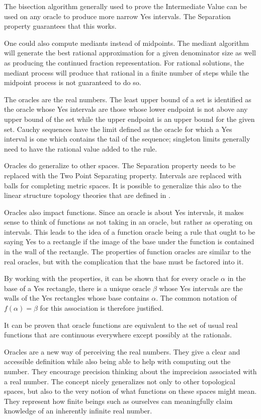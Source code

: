 \documentclass[12pt]{article}
\begin{document}
The bisection algorithm generally used to prove the Intermediate Value can be used on any oracle to produce more narrow Yes intervals. The Separation property guarantees that this works. 

One could also compute mediants instead of midpoints. The mediant algorithm will generate the best rational approximation for a given denominator size as well as producing the continued fraction representation. For rational solutions, the mediant process will produce that rational in a finite number of steps while the midpoint process is not guaranteed to do so. 

The oracles are the real numbers. The least upper bound of a set is identified as the oracle whose Yes intervals are those whose lower endpoint is not above any upper bound of the set while the upper endpoint is an upper bound for the given set. Cauchy sequences have the limit defined as the oracle for which a Yes interval is one which contains the tail of the sequence; singleton limits generally need to have the rational value added to the rule. 

Oracles do generalize to other spaces. The Separation property needs to be replaced with the Two Point Separating property. Intervals are replaced with balls for completing metric spaces. It is possible to generalize this also to the linear structure topology theories that are defined in \cite{maudlin}.

Oracles also impact functions. Since an oracle is about Yes intervals, it makes sense to think of functions as not taking in an oracle, but rather as operating on intervals. This leads to the idea of a function oracle being a rule that ought to be saying Yes to a rectangle if the image of the base under the function is contained in the wall of the rectangle. The properties of function oracles are similar to the real oracles, but with the complication that the base must be factored into it. 

By working with the properties, it can be shown that for every oracle $\alpha$ in the base of a Yes rectangle, there is a unique oracle $\beta$ whose Yes intervals are the walls of the Yes rectangles whose base contains $\alpha$. The common notation of $f(\alpha) = \beta$ for this association is therefore justified. 

It can be proven that oracle functions are equivalent to the set of usual real functions that are continuous everywhere except possibly at the rationals. 

Oracles are a new way of perceiving the real numbers. They give a clear and accessible definition while also being able to help with computing out the number. They encourage precision thinking about the imprecision associated with a real number. The concept nicely generalizes not only to other topological spaces, but also to the very notion of what functions on these spaces might mean. They represent how finite beings such as ourselves can meaningfully claim knowledge of an inherently infinite real number. 


\medskip

\normalem %
\printbibliography
\end{document}
